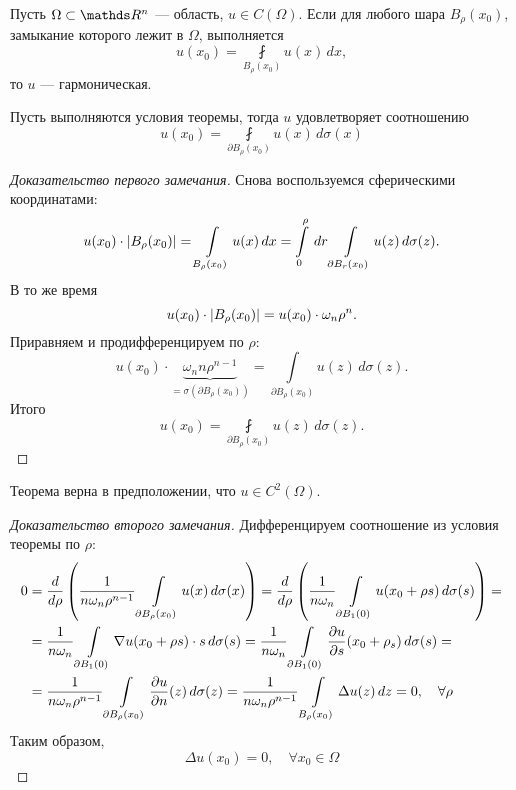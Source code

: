 \begin{theorem}
Пусть $\Omega \subset \real^n$ --- область, $u \in C(\Omega)$. Если для любого шара $B_\rho (x_0)$, замыкание которого лежит в $\Omega$, выполняется
$$ u(x_0) = \fint \limits_{B_\rho(x_0)} u(x) \, dx,$$
то $u$ --- гармоническая. 
\end{theorem}
\begin{note}
Пусть выполняются условия теоремы, тогда $u$ удовлетворяет соотношению
$$ u(x_0) = \fint \limits_{\partial B_\rho(x_0)} u(x) \, d\sigma(x)$$
\end{note}
\begin{proof}[Доказательство первого замечания]
Снова воспользуемся сферическими координатами:
$$u(x_0) \cdot \abs{B_\rho (x_0)} = \int \limits_{B_\rho (x_0)} u(x) \, dx = \int \limits_0^\rho \, dr \int \limits_{\partial B_r (x_0)} u(z) \, d \sigma(z).$$
В то же время
$$ u(x_0) \cdot \abs{B_\rho (x_0)} = u(x_0) \cdot \omega_n \rho^n.$$
Приравняем и продифференцируем по $\rho$:
$$ u(x_0) \cdot \underbrace {\omega_n n \rho^{n-1}}_{= \sigma(\partial B_\rho (x_0))} = \int \limits_{\partial B_\rho (x_0)} u(z) \, d\sigma(z).$$
Итого
$$ u(x_0) = \fint \limits_{\partial B_\rho (x_0)} u(z) \, d\sigma(z).$$

\end{proof}

\begin{note}
Теорема верна в предположении, что $u \in C^2 (\Omega)$.
\end{note}
\begin{proof}[Доказательство второго замечания]
Дифференцируем соотношение из условия теоремы по $\rho$:
\begin{align*}
0 &= \frac {d} {d\rho} \left( \frac {1} {n \omega_n \rho^{n-1}} \int \limits_{\partial B_\rho (x_0)} u(x) \, d\sigma(x) \right) = 
 \frac {d} {d\rho} \left( \frac {1} {n \omega_n} \int \limits_{\partial B_1(0)} u(x_0 + \rho s) \, d\sigma(s) \right) = \\
&= \frac {1} {n \omega_n} \int \limits_{\partial B_1 (0)} \nabla u(x_0 + \rho s) \cdot s \, d\sigma(s) = 
 \frac {1} {n \omega_n} \int \limits_{\partial B_1 (0)} \pder[u]{s}(x_0 +\rho_s) \, d\sigma(s) = \\
&= \frac {1} {n \omega_n \rho^{n-1}} \int \limits_{\partial B_\rho (x_0)} \pder[u]{n}(z) \, d\sigma(z) = 
 \frac {1} {n \omega_n \rho^{n-1}} \int \limits_{B_\rho (x_0)} \Delta u (z) \, dz = 0, \quad \forall \rho
\end{align*}
Таким образом,
$$\Delta u(x_0) = 0, \quad \forall x_0 \in \Omega$$

\end{proof}

